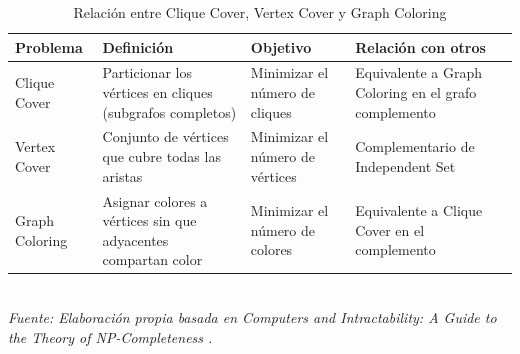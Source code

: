 \begin{table}[h]
\centering
\caption{Relación entre Clique Cover, Vertex Cover y Graph Coloring}
\renewcommand{\arraystretch}{1.4}
\begin{tabular}{|l|p{4.5cm}|p{3.5cm}|p{4.5cm}|}
\hline
\textbf{Problema} & \textbf{Definición} & \textbf{Objetivo} & \textbf{Relación con otros} \\ \hline

Clique Cover 
& Particionar los vértices en cliques (subgrafos completos) 
& Minimizar el número de cliques 
& Equivalente a Graph Coloring en el grafo complemento \\ \hline

Vertex Cover 
& Conjunto de vértices que cubre todas las aristas 
& Minimizar el número de vértices 
& Complementario de Independent Set \\ \hline

Graph Coloring 
& Asignar colores a vértices sin que adyacentes compartan color 
& Minimizar el número de colores 
& Equivalente a Clique Cover en el complemento \\ \hline

\end{tabular}
\\
\vspace{0.15cm}
\small \textit{Fuente: Elaboración propia basada en Computers and Intractability: A Guide to the Theory of NP-Completeness \cite{garey1979}.}
\end{table}


